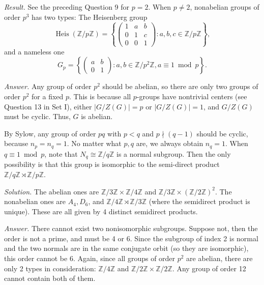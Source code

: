 \documentclass{mathproblems}
\newcommand\Z{\mathbb{Z}}
\begin{document}
\begin{questions}

\textit{Result.} 
See the preceding Question 9 for $p=2$. When $p\neq 2$, nonabelian groups of order $p^3$ has two types: The Heisenberg group
$$
\operatorname{Heis}(\Z/p\Z)=\left\{\begin{pmatrix} 1 & a & b \\ 0 & 1 & c\\ 0 & 0 & 1\end{pmatrix}: a,b,c \in \Z/p\Z \right\},
$$
and a nameless one
$$
G_p=\left\{\begin{pmatrix}a & b\\0 & 1\end{pmatrix}: a,b \in \Z/p^2\Z, a\equiv 1\bmod p \right\}.
$$



\textit{Answer.} Any group of order $p^2$ should be abelian, so there are only two groups of order $p^2$ for a fixed $p$. This is because all $p$-groups have nontrivial centers (see Question 13 in Set I), either $|G/Z(G)|=p$ or $|G/Z(G)|=1$, and $G/Z(G)$ must be cyclic. Thus, $G$ is abelian.

By Sylow, any group of order $p q$ with $p<q$ and $p\nmid (q-1)$ should be cyclic, because $n_p=n_q=1$. No matter what $p,q$ are, we always obtain $n_q=1$. When $q\equiv 1 \bmod{p}$, note that $N_q \cong \Z/q\Z$ is a normal subgroup. Then the only possibility is that this group is isomorphic to the semi-direct product $\Z/q\Z\rtimes \Z/p\Z$. 


\textit{Solution.}
The abelian ones are $\Z/3\Z\times \Z/4\Z$ and $\Z/3\Z\times (\Z/2\Z)^{2}$. The nonabelian ones are $A_4, D_6$, and $\Z/4\Z\rtimes \Z/3\Z$ (where the semidirect product is unique). These are all given by 4 distinct semidirect products.

\textit{Answer.}
There cannot exist two nonisomorphic subgroups. Suppose not, then the order is not a prime, and must be 4 or 6. Since the subgroup of index 2 is normal and the two normals are in the same conjugate orbit (so they are isomorphic), this order cannot be 6. Again, since all groups of order $p^2$ are abelian, there are only 2 types in consideration: $\Z/4\Z$ and $\Z/2\Z\times \Z/2\Z$. Any group of order 12 cannot contain both of them.


\end{questions}
\end{document}
